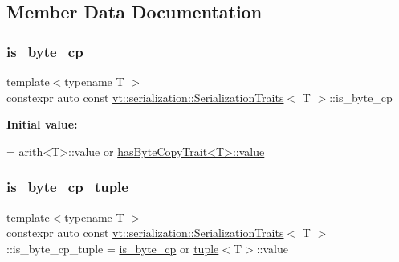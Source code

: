 \subsection{Member Data Documentation}
\mbox{\label{structvt_1_1serialization_1_1_serialization_traits_a38a97b8b969de14ff2893c1ebcb11aba}} 
\subsubsection{\texorpdfstring{is\+\_\+byte\+\_\+cp}{is\_byte\_cp}}
{\footnotesize\ttfamily template$<$typename T $>$ \\
constexpr auto const \hyperlink{structvt_1_1serialization_1_1_serialization_traits}{vt\+::serialization\+::\+Serialization\+Traits}$<$ T $>$\+::is\+\_\+byte\+\_\+cp\hspace{0.3cm}{\ttfamily [static]}}

{\bfseries Initial value\+:}
\begin{DoxyCode}
=
    arith<T>::value or \hyperlink{structvt_1_1serialization_1_1has_byte_copy_trait_ab0e433e90af4c3f2b8b6353fb2bbd34c}{hasByteCopyTrait<T>::value}
\end{DoxyCode}
\mbox{\label{structvt_1_1serialization_1_1_serialization_traits_a6626e6e387c99e6d67ef3859eb152747}} 
\subsubsection{\texorpdfstring{is\+\_\+byte\+\_\+cp\+\_\+tuple}{is\_byte\_cp\_tuple}}
{\footnotesize\ttfamily template$<$typename T $>$ \\
constexpr auto const \hyperlink{structvt_1_1serialization_1_1_serialization_traits}{vt\+::serialization\+::\+Serialization\+Traits}$<$ T $>$\+::is\+\_\+byte\+\_\+cp\+\_\+tuple = \hyperlink{structvt_1_1serialization_1_1_serialization_traits_a38a97b8b969de14ff2893c1ebcb11aba}{is\+\_\+byte\+\_\+cp} or \hyperlink{structvt_1_1serialization_1_1_serialization_traits_ab7e5dd1f060f8077a26dc1c539e7c4fa}{tuple}$<$T$>$\+::value\hspace{0.3cm}{\ttfamily [static]}}

